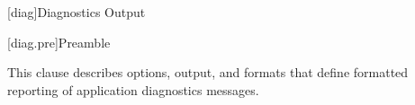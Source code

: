 
[diag]{Diagnostics Output}

[diag.pre]{Preamble}

\pnum
This clause describes options, output, and formats that define formatted
reporting of application diagnostics messages.
